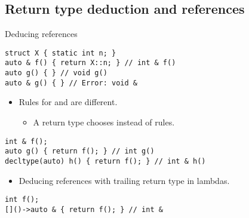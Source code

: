 \subsection{Return type deduction and references}

\begin{frame}[fragile]{Deducing references}
\begin{lstlisting}
struct X { static int n; }
auto & f() { return X::n; } // int & f()
auto g() { } // void g()
auto & g() { } // Error: void &
\end{lstlisting}

\begin{itemize}
  \pause 
  \item Rules for  and  are different.
    \begin{itemize}
      \item A return type  chooses 
            instead of  rules.
    \end{itemize}
\end{itemize}

\begin{lstlisting}
int & f();
auto g() { return f(); } // int g()
decltype(auto) h() { return f(); } // int & h()
\end{lstlisting}

\begin{itemize}
  \pause
  \item Deducing references with trailing return type in lambdas.
\end{itemize}
\begin{lstlisting}
int f();
[]()->auto & { return f(); } // int &
\end{lstlisting}
\end{frame}
